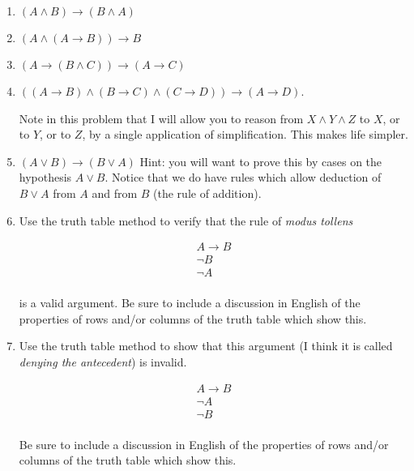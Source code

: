 \documentclass[12pt]{article}
\begin{document}
\begin{enumerate}

\item $(A \wedge B) \rightarrow (B \wedge A)$

\item $(A \wedge (A \rightarrow B)) \rightarrow B$

\item $(A \rightarrow (B \wedge C)) \rightarrow (A \rightarrow C)$

\item $((A \rightarrow B) \wedge (B \rightarrow C) \wedge (C \rightarrow D)) \rightarrow (A \rightarrow D)$.

Note in this problem that I will allow you to reason from $X \wedge Y \wedge Z$ to $X$, or to $Y$, or to $Z$, by a single application of simplification.  This makes life simpler.

\item $(A \vee B) \rightarrow (B \vee A)$  Hint: you will want to prove this by cases on the hypothesis $A \vee B$.  Notice that we do have rules which allow deduction
of $B \vee A$ from $A$ and from $B$ (the rule of addition).

\item Use the truth table method to verify that the rule of {\em modus tollens\/}

$$\begin{array}{c}

A \rightarrow B \\ 

\neg B \\ \hline

\neg A \\

\end{array}$$

is a valid argument.  Be sure to include a discussion in English of the properties of rows and/or columns of the truth table which show this.

\item Use the truth table method to show that this argument (I think it is called {\em denying the antecedent\/}) is invalid.

$$\begin{array}{c}

A \rightarrow B \\ 

\neg A \\ \hline

\neg B \\

\end{array}$$

Be sure to include a discussion in English of the properties of rows and/or columns of the truth table which show this.

\end{enumerate}
\end{document}
